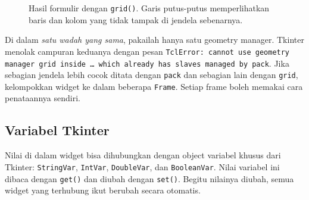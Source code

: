 \begin{figure}[htbp]
\centering
{}
\caption{Hasil formulir dengan \texttt{grid()}. Garis putus-putus memperlihatkan baris dan kolom yang tidak tampak di jendela sebenarnya.}
\end{figure}

\begin{penting}
Di dalam \emph{satu wadah yang sama}, pakailah hanya satu geometry manager. Tkinter menolak campuran keduanya dengan pesan \texttt{TclError: cannot use geometry manager grid inside \ldots\ which already has slaves managed by pack}. Jika sebagian jendela lebih cocok ditata dengan \texttt{pack} dan sebagian lain dengan \texttt{grid}, kelompokkan widget ke dalam beberapa \texttt{Frame}. Setiap frame boleh memakai cara penataannya sendiri.
\end{penting}

\subsection{Variabel Tkinter}

Nilai di dalam widget bisa dihubungkan dengan object variabel khusus dari Tkinter: \texttt{StringVar}, \texttt{IntVar}, \texttt{DoubleVar}, dan \texttt{BooleanVar}. Nilai variabel ini dibaca dengan \texttt{get()} dan diubah dengan \texttt{set()}. Begitu nilainya diubah, semua widget yang terhubung ikut berubah secara otomatis.

